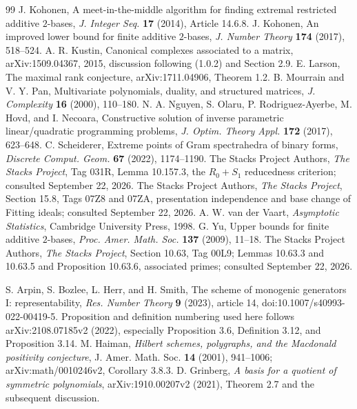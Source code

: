 \begin{thebibliography}{99}
 J. Kohonen, A meet-in-the-middle algorithm for finding extremal restricted additive $2$-bases, \emph{J. Integer Seq.} \textbf{17} (2014), Article 14.6.8.
 J. Kohonen, An improved lower bound for finite additive $2$-bases, \emph{J. Number Theory} \textbf{174} (2017), 518--524.
 A. R. Kustin, Canonical complexes associated to a matrix, arXiv:1509.04367, 2015, discussion following (1.0.2) and Section 2.9.
 E. Larson, The maximal rank conjecture, arXiv:1711.04906, Theorem 1.2.
 B. Mourrain and V. Y. Pan, Multivariate polynomials, duality, and structured matrices, \emph{J. Complexity} \textbf{16} (2000), 110--180.
 N. A. Nguyen, S. Olaru, P. Rodriguez-Ayerbe, M. Hovd, and I. Necoara, Constructive solution of inverse parametric linear/quadratic programming problems, \emph{J. Optim. Theory Appl.} \textbf{172} (2017), 623--648.
 C. Scheiderer, Extreme points of Gram spectrahedra of binary forms, \emph{Discrete Comput. Geom.} \textbf{67} (2022), 1174--1190.
 The Stacks Project Authors, \emph{The Stacks Project}, Tag 031R, Lemma 10.157.3, the $R_0+S_1$ reducedness criterion; consulted September 22, 2026.
 The Stacks Project Authors, \emph{The Stacks Project}, Section 15.8, Tags 07Z8 and 07ZA, presentation independence and base change of Fitting ideals; consulted September 22, 2026.
 A. W. van der Vaart, \emph{Asymptotic Statistics}, Cambridge University Press, 1998.
 G. Yu, Upper bounds for finite additive $2$-bases, \emph{Proc. Amer. Math. Soc.} \textbf{137} (2009), 11--18.
 The Stacks Project Authors, \emph{The Stacks Project}, Section 10.63, Tag 00L9; Lemmas 10.63.3 and 10.63.5 and Proposition 10.63.6, associated primes; consulted September 22, 2026.

 S. Arpin, S. Bozlee, L. Herr, and H. Smith,
The scheme of monogenic generators I: representability,
\emph{Res. Number Theory} \textbf{9} (2023), article 14,
doi:10.1007/s40993-022-00419-5. Proposition and definition numbering
used here follows arXiv:2108.07185v2 (2022), especially Proposition 3.6,
Definition 3.12, and Proposition 3.14.
 M. Haiman,
\emph{Hilbert schemes, polygraphs, and the Macdonald positivity conjecture},
J. Amer. Math. Soc. \textbf{14} (2001), 941--1006;
arXiv:math/0010246v2, Corollary 3.8.3.
 D. Grinberg,
\emph{A basis for a quotient of symmetric polynomials},
arXiv:1910.00207v2 (2021), Theorem 2.7 and the subsequent discussion.


\end{thebibliography}
